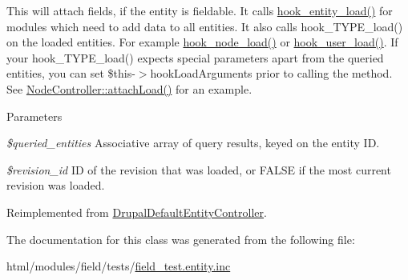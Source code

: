 This will attach fields, if the entity is fieldable. It calls \hyperlink{group__hooks_ga1f594647c8cbb27f75b77cc4118da8d6}{hook\_\-entity\_\-load()} for modules which need to add data to all entities. It also calls hook\_\-TYPE\_\-load() on the loaded entities. For example \hyperlink{group__node__api__hooks_gad48bb14b68ed38526029d1f7ac2d2de4}{hook\_\-node\_\-load()} or \hyperlink{group__hooks_ga81027843e38de3a899fa6e72f876d6b6}{hook\_\-user\_\-load()}. If your hook\_\-TYPE\_\-load() expects special parameters apart from the queried entities, you can set \$this-\/$>$hookLoadArguments prior to calling the method. See \hyperlink{classNodeController_abdc7525854d61d63fa6ee79bb2409359}{NodeController::attachLoad()} for an example.


\begin{DoxyParams}{Parameters}
\item[{\em \$queried\_\-entities}]Associative array of query results, keyed on the entity ID. \item[{\em \$revision\_\-id}]ID of the revision that was loaded, or FALSE if the most current revision was loaded. \end{DoxyParams}


Reimplemented from \hyperlink{classDrupalDefaultEntityController_a68735c41d2ba655a073c64983754edf7}{DrupalDefaultEntityController}.

The documentation for this class was generated from the following file:\begin{DoxyCompactItemize}
\item 
html/modules/field/tests/\hyperlink{field__test_8entity_8inc}{field\_\-test.entity.inc}\end{DoxyCompactItemize}
